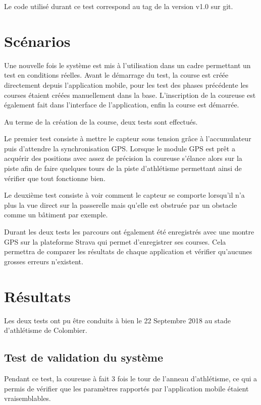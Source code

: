 Le code utilisé durant ce test correspond au tag de la version v1.0 sur git.

\section{Scénarios}

Une nouvelle fois le système est mis à l'utilisation dans un cadre permettant un test en conditions réelles. Avant le démarrage du test, la course est créée directement depuis l'application mobile, pour les test des phases précédente les courses étaient créées manuellement dans la base. L'inscription de la coureuse est également fait dans l'interface de l'application, enfin la course est démarrée.

Au terme de la création de la course, deux tests sont effectués.

Le premier test consiste à mettre le capteur sous tension grâce à l'accumulateur puis d'attendre la synchronisation GPS. Lorsque le module GPS est prêt a acquérir des positions avec assez de précision la coureuse s'élance alors sur la piste afin de faire quelques tours de la piste d'athlétisme permettant ainsi de vérifier que tout fonctionne bien.

Le deuxième test consiste à voir comment le capteur se comporte lorsqu'il n'a plus la vue direct sur la passerelle mais qu'elle est obstruée par un obstacle comme un bâtiment par exemple.

Durant les deux tests les parcours ont également été enregistrés  avec une montre GPS sur la plateforme Strava qui permet d'enregistrer ses courses. Cela permettra de comparer les résultats de chaque application et vérifier qu'aucunes grosses erreurs n'existent.

\section{Résultats}

Les deux tests ont pu être conduits à bien le 22 Septembre 2018 au stade d'athlétisme de Colombier.

\subsection{Test de validation du système}

Pendant ce test, la coureuse à fait 3 fois le tour de l'anneau d'athlétisme, ce qui a permis de vérifier que les paramètres rapportés par l'application mobile étaient vraisemblables.

